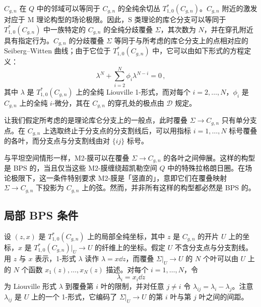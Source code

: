 $C_{g,n}$ 在 $Q$ 中的邻域可以等同于 $C_{g,n}$ 的全纯余切丛 $T^*_{1,0}(C_{g,n})$。$C_{g,n}$ 附近的激发对应于 M 理论构型的场论极限。因此，S 类理论的库仑分支可以等同于 $T^*_{1,0}(C_{g,n})$ 中一族特定的 $C_{g,n}$ 的全纯分歧覆叠 $\Sigma$，其次数为 $N$，并在穿孔附近具有指定行为。$C_{g,n}$ 的分歧覆叠 $\Sigma$ 等同于与所考虑的库仑分支上的点相对应的 Seiberg–Witten 曲线；由于它位于 $T^*_{1,0}(C_{g,n})$ 中，它可以由如下形式的方程定义：
\begin{equation}
\lambda^N+\sum_{i=2}^{N}\phi_i\lambda^{N-i}=0\,,\tag{22.1}
\end{equation}
其中 $\lambda$ 是 $T^*_{1,0}(C_{g,n})$ 上的全纯 Liouville 1-形式，而对每个 $i=2,\dots,N$，$\phi_i$ 是 $C_{g,n}$ 上的全纯 $i$-微分，其在 $C_{g,n}$ 的穿孔处的极点由 $\mathcal{D}$ 规定。


让我们假定所考虑的是理论库仑分支上的一般点，此时覆叠 $\Sigma\to C_{g,n}$ 只有单分支点。在 $C_{g,n}$ 上选取终止于分支点的分支割线后，可以用指标 $i=1,\dots,N$ 标号覆叠的各叶，而分支点与分支割线由对 $\{ij\}$ 标号。

与平坦空间情形一样，M2-膜可以在覆叠 $\Sigma\to C_{g,n}$ 的各叶之间伸展。这样的构型是 BPS 的，当且仅当这些 M2-膜缠绕超凯勒空间 $Q$ 中的特殊拉格朗日圈。在场论极限下，这一条件特别要求 M2-膜是「竖直的」，意即它们在覆叠映射 $\Sigma\to C_{g,n}$ 下投影为 $C_{g,n}$ 上的弦。然而，并非所有这样的构型都必然是 BPS 的。

\subsection{局部 BPS 条件}

设 $(z,x)$ 是 $T^*_{1,0}(C_{g,n})$ 上的局部全纯坐标，其中 $z$ 是 $C_{g,n}$ 的开片 $U$ 上的坐标，$x$ 是 $T^*_{1,0}(C_{g,n})|_U\to U$ 的纤维上的坐标。假定 $U$ 不含分支点与分支割线。用 $z$ 与 $x$ 表示，1-形式 $\lambda$ 读作 $\lambda=x\dd z$，而覆叠 $\Sigma|_U\to U$ 的 $N$ 个叶可以由 $U$ 上的 $N$ 个函数 $x_1(z),\dots,x_N(z)$ 描述。对每个 $i=1,\dots,N$，令
\[
\lambda_i=x_i\dd z
\]
为 Liouville 形式 $\lambda$ 到覆叠第 $i$ 叶的限制，并对任意 $j\ne i$ 令 $\lambda_{ij}=\lambda_i-\lambda_j$。注意 $\lambda_{ij}$ 是 $U$ 上的一个 1-形式，它编码了 $\Sigma|_U\to U$ 的第 $i$ 叶与第 $j$ 叶之间的间距。

